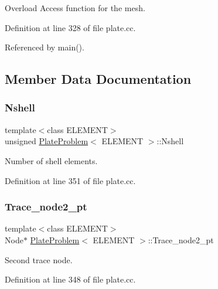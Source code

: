 Overload Access function for the mesh. 



Definition at line 328 of file plate.\+cc.



Referenced by main().



\subsection{Member Data Documentation}
\mbox{\label{classPlateProblem_a6e6ae2cacb761fd29c738e7ffe54a2d0}} 
\subsubsection{\texorpdfstring{Nshell}{Nshell}}
{\footnotesize\ttfamily template$<$class E\+L\+E\+M\+E\+NT$>$ \\
unsigned \hyperlink{classPlateProblem}{Plate\+Problem}$<$ E\+L\+E\+M\+E\+NT $>$\+::Nshell\hspace{0.3cm}{\ttfamily [private]}}



Number of shell elements. 



Definition at line 351 of file plate.\+cc.

\mbox{\label{classPlateProblem_afdefc2caa57f4c3fe62c05a04fe330c1}} 
\subsubsection{\texorpdfstring{Trace\+\_\+node2\+\_\+pt}{Trace\_node2\_pt}}
{\footnotesize\ttfamily template$<$class E\+L\+E\+M\+E\+NT$>$ \\
Node$\ast$ \hyperlink{classPlateProblem}{Plate\+Problem}$<$ E\+L\+E\+M\+E\+NT $>$\+::Trace\+\_\+node2\+\_\+pt\hspace{0.3cm}{\ttfamily [private]}}



Second trace node. 



Definition at line 348 of file plate.\+cc.

